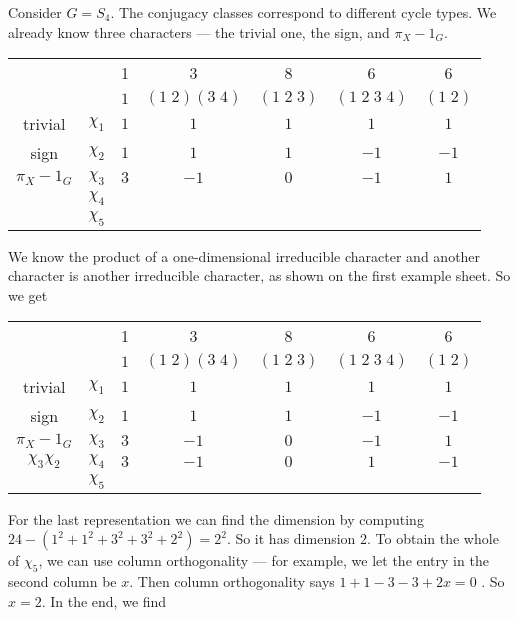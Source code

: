 \documentclass[a4paper]{article}
\begin{document}
\begin{eg}
  Consider $G = S_4$. The conjugacy classes correspond to different cycle types. We already know three characters --- the trivial one, the sign, and $\pi_X - 1_G$.
  \begin{center}
    \begin{tabular}{ccccccc}
      \toprule
      & & 1 & 3 & 8 & 6 & 6\\
      & & $1$ & $(1\; 2)(3\; 4)$ & $(1\; 2\; 3)$ & $(1\; 2\; 3\; 4)$ & $(1\; 2)$\\
      \midrule
      trivial & $\chi_1$ & $1$ & $1$ & $1$ & $1$ & $1$\\
      sign & $\chi_2$ & $1$ & $1$ & $1$ & $-1$ & $-1$\\
      $\pi_X - 1_G$ & $\chi_3$ & $3$ & $-1$ & $0$ & $-1$ & $1$\\
      & $\chi_4$\\
      & $\chi_5$\\
      \bottomrule
    \end{tabular}
  \end{center}
  We know the product of a one-dimensional irreducible character and another character is another irreducible character, as shown on the first example sheet. So we get
  \begin{center}
    \begin{tabular}{ccccccc}
      \toprule
      & & 1 & 3 & 8 & 6 & 6\\
      & & $1$ & $(1\; 2)(3\; 4)$ & $(1\; 2\; 3)$ & $(1\; 2\; 3\; 4)$ & $(1\; 2)$\\
      \midrule
      trivial & $\chi_1$ & $1$ & $1$ & $1$ & $1$ & $1$\\
      sign & $\chi_2$ & $1$ & $1$ & $1$ & $-1$ & $-1$\\
      $\pi_X - 1_G$ & $\chi_3$ & $3$ & $-1$ & $0$ & $-1$ & $1$\\
      $\chi_3 \chi_2$ & $\chi_4$ & $3$ & $-1$ & $0$ & $1$ & $-1$\\
      & $\chi_5$ &\\
      \bottomrule
    \end{tabular}
  \end{center}
  For the last representation we can find the dimension by computing $24 - (1^2 + 1^2 + 3^2 + 3^2 + 2^2) = 2^2$. So it has dimension $2$. To obtain the whole of $\chi_5$, we can use column orthogonality --- for example, we let the entry in the second column be $x$. Then column orthogonality says $1 + 1 - 3 - 3 + 2x = 0$ . So $x = 2$. In the end, we find
  \begin{center}

\end{center}
\end{eg}
\end{document}
